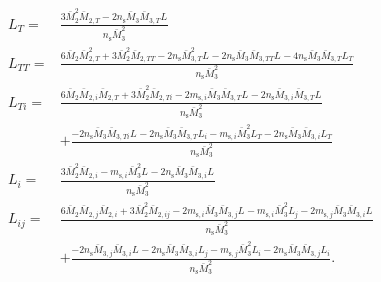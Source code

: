 \documentclass[english]{../thermomemo/thermomemo}
\newcommand{\seg}{\ensuremath{\text{s}}\xspace}
\begin{document}
\begin{align}
  \label{eq:L_diff2}
  L_{T} =& \frac{3 \bar{M}_{2}^2 \bar{M}_{2,T} - 2 n_{\seg} \bar{M}_{3}\bar{M}_{3,T} L_{} }{n_{\seg} \bar{M}_{3}^2} \\
  L_{TT} =& \frac{6 \bar{M}_{2} \bar{M}_{2,T}^2 + 3 \bar{M}_{2}^2 \bar{M}_{2,TT} -  2 n_{\seg} \bar{M}_{3,T}^2 L_{} - 2 n_{\seg} \bar{M}_{3}\bar{M}_{3,TT} L_{} - 4 n_{\seg} \bar{M}_{3}\bar{M}_{3,T} L_{T}}{n_{\seg} \bar{M}_{3}^2} \\
L_{Ti} =& \frac{ 6 \bar{M}_{2} \bar{M}_{2,i} \bar{M}_{2,T} + 3 \bar{M}_{2}^2 \bar{M}_{2,Ti} -   2 m_{\seg,i} \bar{M}_{3}\bar{M}_{3,T} L_{}  - 2 n_{\seg} \bar{M}_{3,i}\bar{M}_{3,T} L_{} }{n_{\seg} \bar{M}_{3}^2} \nonumber\\ &+\frac{- 2 n_{\seg} \bar{M}_{3}\bar{M}_{3,Ti} L_{} - 2 n_{\seg} \bar{M}_{3}\bar{M}_{3,T} L_{i} -  m_{\seg,i} \bar{M}_{3}^2 L_{T}  -  2 n_{\seg} \bar{M}_{3} \bar{M}_{3,i} L_{T}}{n_{\seg} \bar{M}_{3}^2} \\
   L_{i} =& \frac{ 3 \bar{M}_{2}^2 \bar{M}_{2,i} - m_{\seg,i} \bar{M}_{3}^2 L_{} - 2 n_{\seg} \bar{M}_{3} \bar{M}_{3,i} L_{}}{n_{\seg} \bar{M}_{3}^2} \\
 L_{ij} =& \frac{ 6 \bar{M}_{2} \bar{M}_{2,j} \bar{M}_{2,i} + 3 \bar{M}_{2}^2 \bar{M}_{2,ij} -  2 m_{\seg,i} \bar{M}_{3} \bar{M}_{3,j} L_{} - m_{\seg,i} \bar{M}_{3}^2 L_{j}  - 2 m_{\seg,j} \bar{M}_{3} \bar{M}_{3,i} L_{}}{n_{\seg} \bar{M}_{3}^2} \nonumber \\ &+  \frac{ - 2 n_{\seg} \bar{M}_{3,j} \bar{M}_{3,i} L_{} - 2 n_{\seg} \bar{M}_{3} \bar{M}_{3,i} L_{j}
  - m_{\seg,j} \bar{M}_{3}^2 L_{i} - 2 n_{\seg} \bar{M}_{3} \bar{M}_{3,j} L_{i}}{n_{\seg} \bar{M}_{3}^2}.
\end{align}
\clearpage


\end{document}

